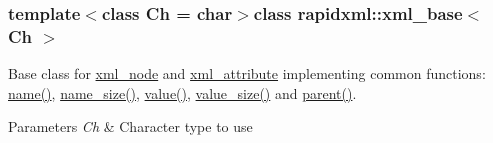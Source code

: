 \subsubsection*{template$<$class Ch = char$>$class rapidxml\-::xml\-\_\-base$<$ Ch $>$}

Base class for \hyperlink{classrapidxml_1_1xml__node}{xml\-\_\-node} and \hyperlink{classrapidxml_1_1xml__attribute}{xml\-\_\-attribute} implementing common functions\-: \hyperlink{classrapidxml_1_1xml__base_a9a09739310469995db078ebd0da3ed45}{name()}, \hyperlink{classrapidxml_1_1xml__base_a7e7f98b3d01e1eab8dc1ca69aad9af84}{name\-\_\-size()}, \hyperlink{classrapidxml_1_1xml__base_adcdaccff61c665f039d9344e447b7445}{value()}, \hyperlink{classrapidxml_1_1xml__base_a9fcf201ed0915ac18dd43b0b5dcfaf32}{value\-\_\-size()} and \hyperlink{classrapidxml_1_1xml__base_a7f31ae930f93852830234db1ae59c4c4}{parent()}. 
\begin{DoxyParams}{Parameters}
{\em Ch} & Character type to use \\
\hline
\end{DoxyParams}


